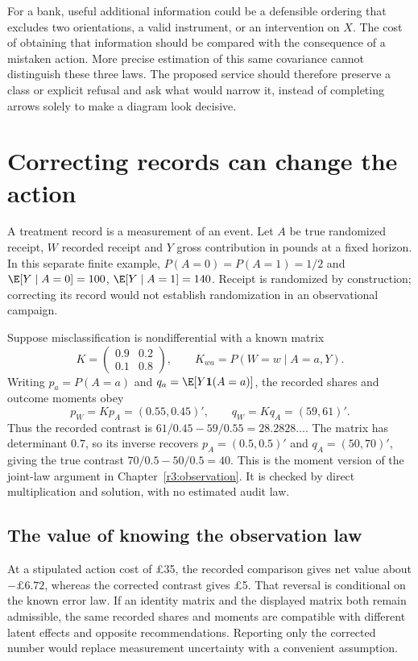 For a bank, useful additional information could be a defensible ordering
that excludes two orientations, a valid instrument, or an intervention on
$X$. The cost of obtaining that information should be compared with the
consequence of a mistaken action. More precise estimation of this same
covariance cannot distinguish these three laws. The proposed service should
therefore preserve a class or explicit refusal and ask what would narrow it,
instead of completing arrows solely to make a diagram look decisive.

\chapter{Correcting records can change the action}
\label{rewrite:observation}

A treatment record is a measurement of an event. Let $A$ be true randomized
receipt, $W$ recorded receipt and $Y$ gross contribution in pounds at a
fixed horizon. In this separate finite example, $P(A=0)=P(A=1)=1/2$
and $\E[Y\mid A=0]=100$, $\E[Y\mid A=1]=140$. Receipt is
randomized by construction; correcting its record would not establish
randomization in an observational campaign.

Suppose misclassification is nondifferential with a known matrix
\[
 K=\begin{pmatrix}0.9&0.2\\0.1&0.8\end{pmatrix},
 \qquad K_{wa}=P(W=w\mid A=a,Y).
\]
Writing $p_a=P(A=a)$ and $q_a=\E[Y\mathbf1(A=a)]$, the recorded
shares and outcome moments obey
\[
 p_W=Kp_A=(0.55,0.45)' ,\qquad q_W=Kq_A=(59,61)' .
\]
Thus the recorded contrast is $61/0.45-59/0.55=28.2828\ldots$.
The matrix has determinant $0.7$, so its inverse recovers
$p_A=(0.5,0.5)'$ and $q_A=(50,70)'$, giving the true contrast
$70/0.5-50/0.5=40$. This is the moment version of the joint-law
argument in Chapter~\ref{r3:observation}. It is checked by direct
multiplication and solution, with no estimated audit law.

\section{The value of knowing the observation law}
At a stipulated action cost of \pounds35, the recorded comparison gives
net value about $-\pounds6.72$, whereas the corrected contrast gives
\pounds5. That reversal is conditional on the known error law. If an
identity matrix and the displayed matrix both remain admissible, the same
recorded shares and moments are compatible with different latent effects
and opposite recommendations. Reporting only the corrected number would
replace measurement uncertainty with a convenient assumption.

